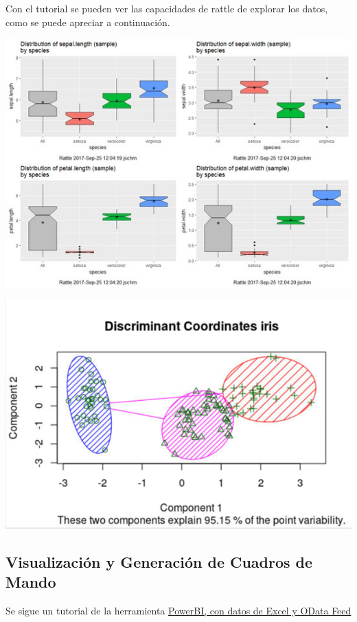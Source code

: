 \documentclass[
]{book}
\begin{document}
Con el tutorial se pueden ver las capacidades de rattle de explorar los datos, como se puede apreciar a continuación.

\includegraphics{images/T3-rattle2.png}

\includegraphics{images/T3-rattle3.png}

\subsection{Visualización y Generación de Cuadros de Mando}\label{visualizaciuxf3n-y-generaciuxf3n-de-cuadros-de-mando}

Se sigue un tutorial de la herramienta \href{https://docs.microsoft.com/es-es/power-bi/desktop-tutorial-analyzing-sales-data-from-excel-and-an-odata-feed}{PowerBI, con datos de Excel y OData Feed}
\end{document}
